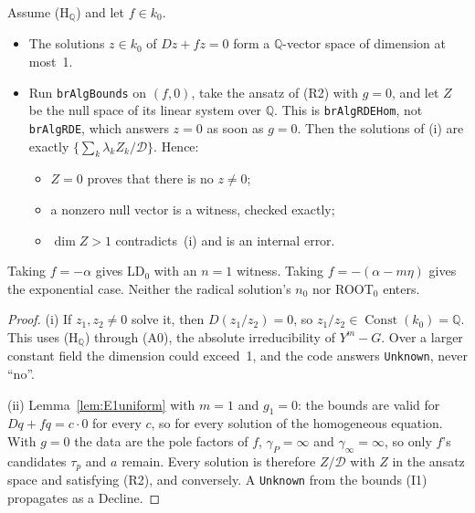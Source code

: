 \documentclass[11pt]{article}
\theoremstyle{definition}
\theoremstyle{remark}
\newcommand{\Q}{\mathbb{Q}}
\newcommand{\code}[1]{\texttt{#1}}
\begin{document}
\begin{corollary}\label{cor:E1hom}
Assume (H$_\Q$) and let $f\in k_0$.
\begin{itemize}
\item[(i)] The solutions $z\in k_0$ of $Dz+fz=0$ form a $\Q$-vector space of dimension at most~1.
\item[(ii)] Run \code{brAlgBounds} on $(f,0)$, take the ansatz of (R2) with $g=0$, and let $Z$ be
  the null space of its linear system over $\Q$. This is \code{brAlgRDEHom}, not \code{brAlgRDE},
  which answers $z=0$ as soon as $g=0$. Then the solutions of (i) are exactly
  $\{\sum_k\lambda_kZ_k/\mathcal D\}$. Hence:
  \begin{itemize}
  \item $Z=0$ proves that there is no $z\ne0$;
  \item a nonzero null vector is a witness, checked exactly;
  \item $\dim Z>1$ contradicts~(i) and is an internal error.
  \end{itemize}
\end{itemize}
Taking $f=-\alpha$ gives LD$_0$ with an $n=1$ witness. Taking $f=-(\alpha-m\eta)$ gives the
exponential case. Neither the radical solution's $n_0$ nor ROOT$_0$ enters.
\end{corollary}
\begin{proof}
(i) If $z_1,z_2\ne0$ solve it, then $D(z_1/z_2)=0$, so $z_1/z_2\in\operatorname{Const}(k_0)=\Q$.
This uses (H$_\Q$) through (A0), the absolute irreducibility of $Y^m-G$. Over a larger constant
field the dimension could exceed~1, and the code answers \code{Unknown}, never ``no''.

(ii) Lemma~\ref{lem:E1uniform} with $m=1$ and $g_1=0$: the bounds are valid for
$Dq+fq=c\cdot0$ for every $c$, so for every solution of the homogeneous equation. With $g=0$ the
data are the pole factors of $f$, $\gamma_P=\infty$ and $\gamma_\infty=\infty$, so only $f$'s
candidates $\tau_p$ and $a$ remain. Every solution is therefore $Z/\mathcal D$ with $Z$ in the
ansatz space and satisfying (R2), and conversely. A \code{Unknown} from the bounds (I1)
propagates as a Decline.
\end{proof}
\end{document}
